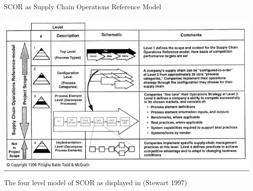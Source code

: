 \documentclass{beamer}
\begin{document}
\begin{frame}{SCOR as Supply Chain Operations Reference Model}

\begin{center}
  \includegraphics[width=.9\textwidth]{Stewart-1997.png}\\
  The four level model of SCOR as displayed in (Stewart 1997)
\end{center}

\end{frame}
\end{document}
